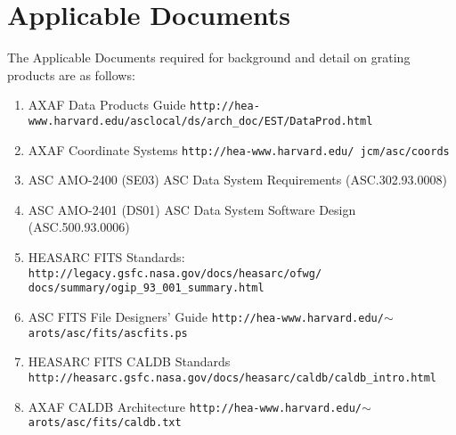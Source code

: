 \documentclass[twoside]{article}
\begin{document}
\section{Applicable Documents}
The Applicable Documents required for background and detail on
grating products are as follows:
\begin{enumerate}
%
\item\label{appdoc:data-prod} 
  AXAF Data Products Guide\newline
  {\tt http://hea-www.harvard.edu/asclocal/ds/arch\_doc/EST/DataProd.html}
%
\item\label{appdoc:coord}
 AXAF Coordinate Systems\newline
    {\tt http://hea-www.harvard.edu/~jcm/asc/coords}
%
\item\label{appdoc:se03}
 ASC AMO-2400 (SE03) \newline
 ASC Data System Requirements (ASC.302.93.0008)
%
\item\label{appdoc:ds01}
 ASC AMO-2401 (DS01) \newline
 ASC Data System Software Design (ASC.500.93.0006)
%
%
\item\label{appdoc:fitsstd}
 HEASARC FITS Standards:\newline
{\tt http://legacy.gsfc.nasa.gov/docs/heasarc/ofwg/}\newline
{\tt docs/summary/ogip\_93\_001\_summary.html}
%
\item\label{appdoc:ascfits}
  ASC FITS File Designers' Guide\newline
  {\tt http://hea-www.harvard.edu/$\sim$arots/asc/fits/ascfits.ps}
%
%
\item\label{appdoc:heasarccaldb}
  HEASARC FITS CALDB Standards\newline
  {\tt http://heasarc.gsfc.nasa.gov/docs/heasarc/caldb/caldb\_intro.html}
%
\item\label{appdoc:asccaldb}
  AXAF CALDB Architecture\newline
  {\tt http://hea-www.harvard.edu/$\sim$arots/asc/fits/caldb.txt}
%
\end{enumerate}

%
%
\end{document}

